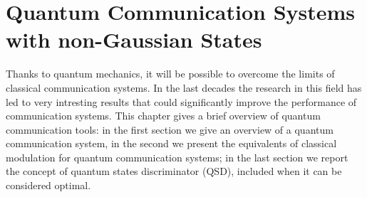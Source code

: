 
\chapter{Quantum Communication Systems with non-Gaussian States}
    Thanks to quantum mechanics, it will be possible to overcome the limits of classical 
    communication systems. In the last decades the research in this field has led to very 
    intresting results that could significantly improve the performance of communication systems. 
    This chapter gives a brief overview of quantum communication tools: in the first section we
    give an overview of a quantum communication system, in the second we present the equivalents 
    of classical modulation for quantum communication systems; in the last 
    section we report the concept of quantum states discriminator (QSD), included when it can be 
    considered optimal.

    
    
    
